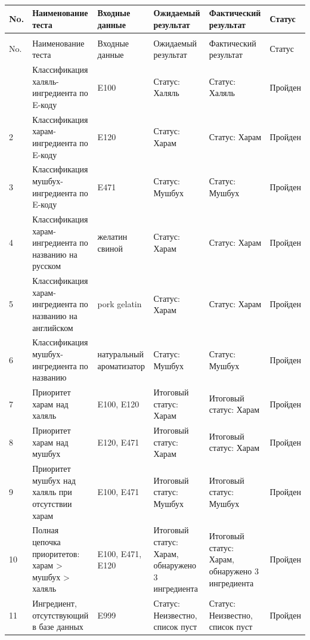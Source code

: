 \begin{longtable}{|>{\small}p{0.7cm}|>{\small}p{3.1cm}|>{\small}p{2.1cm}|>{\small}p{2.9cm}|>{\small}p{3.1cm}|>{\small}p{1.8cm}|}
	\caption{Результаты классификации ингредиентов}\label{tab:classification}\\
	\hline
		No. & Наименование теста & Входные данные & Ожидаемый результат & Фактический результат & Статус \\
	\hline
	\endfirsthead
	\captionsetup{format=tablenocaption,labelformat=continued}
	\caption[]{}\\
	\hline
		No. & Наименование теста & Входные данные & Ожидаемый результат & Фактический результат & Статус \\
	\hline
	\endhead
	\hline
	\endfoot
	\hline
	\endlastfoot
		1 & Классификация халяль-ингредиента по E-коду & E100 & Статус: Халяль & Статус: Халяль & Пройден \\
	\hline
		2 & Классификация харам-ингредиента по E-коду & E120 & Статус: Харам & Статус: Харам & Пройден \\
	\hline
		3 & Классификация мушбух-ингредиента по E-коду & E471 & Статус: Мушбух & Статус: Мушбух & Пройден \\
	\hline
		4 & Классификация харам-ингредиента по названию на русском & желатин свиной & Статус: Харам & Статус: Харам & Пройден \\
	\hline
		5 & Классификация харам-ингредиента по названию на английском & pork gelatin & Статус: Харам & Статус: Харам & Пройден \\
	\hline
		6 & Классификация мушбух-ингредиента по названию & на\-ту\-раль\-ный аро\-ма\-ти\-за\-тор & Статус: Мушбух & Статус: Мушбух & Пройден \\
	\hline
		7 & Приоритет харам над халяль & E100, E120 & Итоговый статус: Харам & Итоговый статус: Харам & Пройден \\
	\hline
		8 & Приоритет харам над мушбух & E120, E471 & Итоговый статус: Харам & Итоговый статус: Харам & Пройден \\
	\hline
		9 & Приоритет мушбух над халяль при отсутствии харам & E100, E471 & Итоговый статус: Мушбух & Итоговый статус: Мушбух & Пройден \\
	\hline
		10 & Полная цепочка приоритетов: харам > мушбух > халяль & E100, E471, E120 & Итоговый статус: Харам, обнаружено 3 ингредиента & Итоговый статус: Харам, обнаружено 3 ингредиента & Пройден \\
	\hline
		11 & Ингредиент, отсутствующий в базе данных & E999 & Статус: Неизвестно, список пуст & Статус: Неизвестно, список пуст & Пройден \\
\end{longtable}


